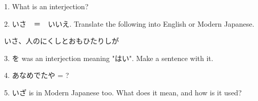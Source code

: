 \par{1. What is an interjection? }

\par{2. いさ　＝　いいえ. Translate the following into English or Modern Japanese. }

\par{いさ、人のにくしとおもひたりしが }

\par{3. を was an interjection meaning "はい". Make a sentence with it. }

\par{4. あなめでたや = ? }

\par{5. いざ is in Modern Japanese too. What does it mean, and how is it used? }
    